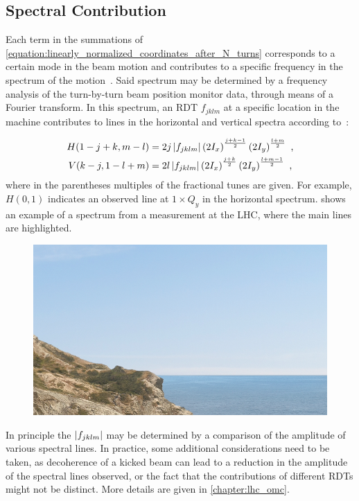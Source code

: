 \subsection{Spectral Contribution}
\label{subsec:spectral_contribution}

Each term in the summations of \cref{equation:linearly_normalized_coordinates_after_N_turns} corresponds to a certain mode in the beam motion and contributes to a specific frequency in the spectrum of the motion~\cite{PHD:Bengtsson}.
Said spectrum may be determined by a frequency analysis of the turn-by-turn beam position monitor data, through means of a Fourier transform.
In this spectrum, an \gls{RDT} \(f_{jklm}\) at a specific location in the machine contributes to lines in the horizontal and vertical spectra according to~\cite{PHD:Bengtsson,PRAB:Franchi:Emittance_Sharing_Coupling}:

\begin{equation}
    \begin{aligned}
        H(1-j+k, m-l) &= 2 j \left\lvert f_{jklm} \right\rvert \left( 2 I_x \right)^{\frac{j+k-1}{2}} \left( 2 I_y \right)^{\frac{l+m}{2}} \text{ ,}\\
        V(k-j, 1-l+m) &= 2 l \left\lvert f_{jklm} \right\rvert \left( 2 I_x \right)^{\frac{j+k}{2}} \left( 2 I_y \right)^{\frac{l+m-1}{2}} \text{ ,}
    \end{aligned}
    \label{equation:rdt_contribution_to_spectrum_line}
\end{equation}
where in the parentheses multiples of the fractional tunes are given.
For example, \(H(0,1)\) indicates an observed line at \(1 \times Q_y\) in the horizontal spectrum.
 shows an example of a spectrum from a measurement at the \gls{LHC}, where the main lines are highlighted.

\begin{figure}[!htb]
    \centering
    \includegraphics[width = 0.3\linewidth]{Figures/placeholder.png}
    \caption{}
    \label{figure:example_spectrum}
\end{figure}

In principle the \(\left\lvert f_{jklm} \right\rvert\) may be determined by a comparison of the amplitude of various spectral lines.
In practice, some additional considerations need to be taken, as decoherence of a kicked beam can lead to a reduction in the amplitude of the spectral lines observed, or the fact that the contributions of different \glspl{RDT} might not be distinct.
More details are given in \cref{chapter:lhc_omc}.

